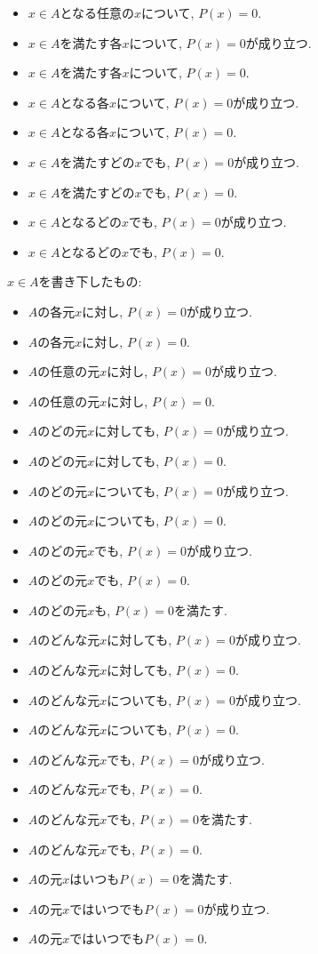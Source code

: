 \documentclass[a4paper,12pt,draft]{amsart}
\newcommand{\PPP}[1]{P(#1)=0}
\begin{document}
\begin{itemize}
\item $x\in A$となる任意の$x$について, $\PPP{x}$.
\item $x\in A$を満たす各$x$について, $\PPP{x}$が成り立つ.
\item $x\in A$を満たす各$x$について, $\PPP{x}$.
\item $x\in A$となる各$x$について, $\PPP{x}$が成り立つ.
\item $x\in A$となる各$x$について, $\PPP{x}$.
\item $x\in A$を満たすどの$x$でも, $\PPP{x}$が成り立つ.
\item $x\in A$を満たすどの$x$でも, $\PPP{x}$.
\item $x\in A$となるどの$x$でも, $\PPP{x}$が成り立つ.
\item $x\in A$となるどの$x$でも, $\PPP{x}$.
\end{itemize}
$x\in A$を書き下したもの:
\begin{itemize}
\item $A$の各元$x$に対し, $\PPP{x}$が成り立つ.
\item $A$の各元$x$に対し, $\PPP{x}$.
\item $A$の任意の元$x$に対し, $\PPP{x}$が成り立つ.
\item $A$の任意の元$x$に対し, $\PPP{x}$.
\item $A$のどの元$x$に対しても, $\PPP{x}$が成り立つ.
\item $A$のどの元$x$に対しても, $\PPP{x}$.
\item $A$のどの元$x$についても, $\PPP{x}$が成り立つ.
\item $A$のどの元$x$についても, $\PPP{x}$.
\item $A$のどの元$x$でも, $\PPP{x}$が成り立つ.
\item $A$のどの元$x$でも, $\PPP{x}$.
\item $A$のどの元$x$も, $\PPP{x}$を満たす.
\item $A$のどんな元$x$に対しても, $\PPP{x}$が成り立つ.
\item $A$のどんな元$x$に対しても, $\PPP{x}$.
\item $A$のどんな元$x$についても, $\PPP{x}$が成り立つ.
\item $A$のどんな元$x$についても, $\PPP{x}$.
\item $A$のどんな元$x$でも, $\PPP{x}$が成り立つ.
\item $A$のどんな元$x$でも, $\PPP{x}$.
\item $A$のどんな元$x$でも, $\PPP{x}$を満たす.
\item $A$のどんな元$x$でも, $\PPP{x}$.
\item $A$の元$x$はいつも$\PPP{x}$を満たす.
\item $A$の元$x$ではいつでも$\PPP{x}$が成り立つ.
\item $A$の元$x$ではいつでも$\PPP{x}$.
\end{itemize}
\end{document}
